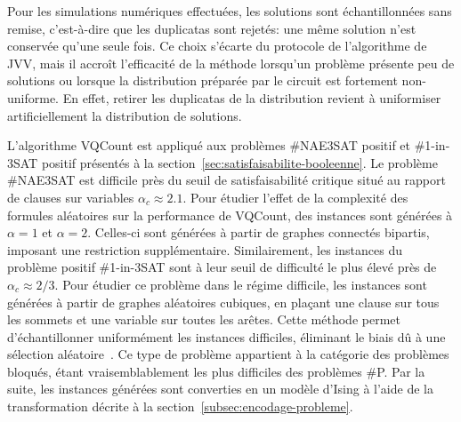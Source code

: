 Pour les simulations numériques effectuées, les solutions sont échantillonnées sans remise, c'est-à-dire que les duplicatas sont rejetés: une même solution n'est conservée qu'une seule fois. Ce choix s'écarte du protocole de l'algorithme de JVV, mais il accroît l'efficacité de la méthode lorsqu'un problème présente peu de solutions ou lorsque la distribution préparée par le circuit est fortement non-uniforme. En effet, retirer les duplicatas de la distribution revient à uniformiser artificiellement la distribution de solutions.

L'algorithme VQCount est appliqué aux problèmes \#NAE3SAT positif et \#1-in-3SAT positif présentés à la section~\ref{sec:satisfaisabilite-booleenne}. Le problème \#NAE3SAT est difficile près du seuil de satisfaisabilité critique situé au rapport de clauses sur variables $\alpha_{c} \approx 2.1$. Pour étudier l'effet de la complexité des formules aléatoires sur la performance de VQCount, des instances sont générées à $\alpha = 1$ et $\alpha = 2$. Celles-ci sont générées à partir de graphes connectés bipartis, imposant une restriction supplémentaire. Similairement, les instances du problème positif \#1-in-3SAT sont à leur seuil de difficulté le plus élevé près de $\alpha_{c} \approx 2/3$. Pour étudier ce problème dans le régime difficile, les instances sont générées à partir de graphes aléatoires cubiques, en plaçant une clause sur tous les sommets et une variable sur toutes les arêtes. Cette méthode permet d'échantillonner uniformément les instances difficiles, éliminant le biais dû à une sélection aléatoire~\cite{vigerEfficientSimpleGeneration2005}. Ce type de problème appartient à la catégorie des problèmes bloqués, étant vraisemblablement les plus difficiles des problèmes \textsf{\#P}. Par la suite, les instances générées sont converties en un modèle d'Ising à l'aide de la transformation décrite à la section~\ref{subsec:encodage-probleme}.


